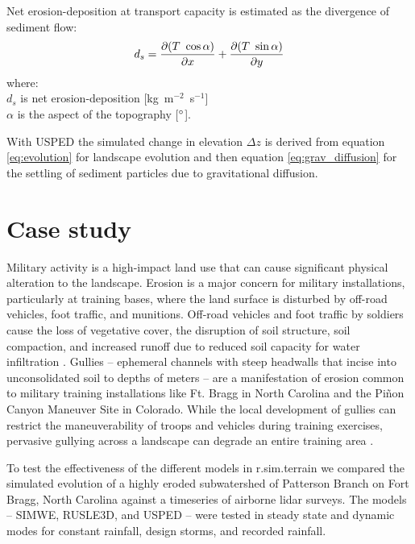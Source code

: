 \documentclass[gmd, manuscript]{copernicus}
\begin{document}
\noindent
Net erosion-deposition at transport capacity is estimated as the divergence of sediment flow: 
\begin{equation}\label{eq:usped_erdep} 
d_s = 
{\partial (T ~ \cos \alpha) \over \partial x} +
{\partial (T ~ \sin \alpha) \over \partial y}
\end{equation}
{\small
\noindent
where: \\
\hspace*{0.5em} $d_s$ is net erosion-deposition [\unit{kg~m}$^{-2}$~\unit{s}$^{-1}$]\\
\hspace*{0.5em} $\alpha$ is the aspect of the topography [$^{\circ}$].\\
}


\noindent
With USPED the simulated change in elevation $\Delta z$
is derived from equation \ref{eq:evolution} for landscape evolution
and then equation \ref{eq:grav_diffusion}
for the settling of sediment particles due to gravitational diffusion.


\section{Case study} 

Military activity is a high-impact land use 
that can cause significant physical alteration to the landscape. 
Erosion is a major concern for military installations, 
particularly at training bases, 
where the land surface is disturbed by 
off-road vehicles, foot traffic, and munitions. 
Off-road vehicles and foot traffic by soldiers 
cause the loss of vegetative cover, 
the disruption of soil structure, soil compaction, 
and increased runoff due to 
reduced soil capacity for water infiltration 
\citep{Webb1983, McDonald2004}.
Gullies -- ephemeral channels with steep headwalls 
that incise into unconsolidated soil to depths of meters -- 
are a manifestation of erosion common to 
military training installations like Ft. Bragg in North Carolina 
and the Pi\~{n}on Canyon Maneuver Site in Colorado. 
While the local development of gullies can restrict 
the maneuverability of troops and vehicles during training exercises, 
pervasive gullying across a landscape 
can degrade an entire training area 
\citep{Huang2014}.

To test the effectiveness of the different models 
in r.sim.terrain
we compared the simulated evolution
of a highly eroded subwatershed of 
Patterson Branch on Fort Bragg, North Carolina
against a timeseries of airborne lidar surveys.
The models -- SIMWE, RUSLE3D, and USPED --
were tested in steady state and dynamic modes
for constant rainfall, design storms, and recorded rainfall.
\end{document}
